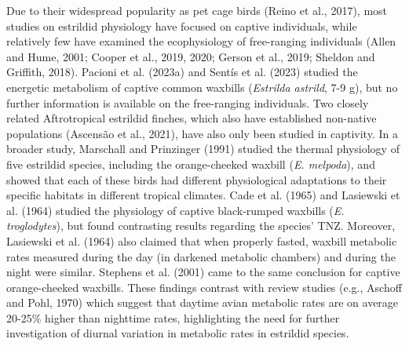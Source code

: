 \documentclass[10pt, twoside]{book} %
\begin{document}
Due to their widespread popularity as pet cage birds (Reino et al., 2017), most studies on estrildid physiology have focused on captive individuals, while relatively few have examined the ecophysiology of free-ranging individuals (Allen and Hume, 2001; Cooper et al., 2019, 2020; Gerson et al., 2019; Sheldon and Griffith, 2018). Pacioni et al. (2023a) and Sentís et al. (2023) studied the energetic metabolism of captive common waxbills (\textit{Estrilda astrild}, 7-9 g), but no further information is available on the free-ranging individuals. Two closely related Aftrotropical estrildid finches, which also have established non-native populations (Ascensão et al., 2021), have also only been studied in captivity. In a broader study, Marschall and Prinzinger (1991) studied the thermal physiology of five estrildid species, including the orange-cheeked waxbill (\textit{E. melpoda}), and showed that each of these birds had different physiological adaptations to their specific habitats in different tropical climates. Cade et al. (1965) and Lasiewski et al. (1964) studied the physiology of captive black-rumped waxbills (\textit{E. troglodytes}), but found contrasting results regarding the species' TNZ. Moreover, Lasiewski et al. (1964) also claimed that when properly fasted, waxbill metabolic rates measured during the day (in darkened metabolic chambers) and during the night were similar. Stephens et al. (2001) came to the same conclusion for captive orange-cheeked waxbills. These findings contrast with review studies (e.g., Aschoff and Pohl, 1970) which suggest that daytime avian metabolic rates are on average 20-25\% higher than nighttime rates, highlighting the need for further investigation of diurnal variation in metabolic rates in estrildid species. \\
\end{document}
